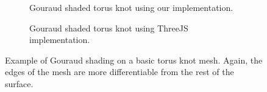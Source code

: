 \documentclass[10pt,twocolumn,letterpaper]{article}
\begin{document}
\begin{figure}
    \centering
    \begin{subfigure}{.48\linewidth}
        \caption{Gouraud shaded torus knot using our implementation.}
        \label{fig:our-gouraud-tk}
    \end{subfigure}
    \hfill
    \begin{subfigure}{.48\linewidth}
        \caption{Gouraud shaded torus knot using ThreeJS implementation.}
        \label{fig:three-gouraud-tk}
    \end{subfigure}
    \caption{Example of Gouraud shading on a basic torus knot mesh. Again, the edges of the mesh are more differentiable from the rest of the surface.}
    \label{fig:gouraud-tk}
\end{figure}
\end{document}
